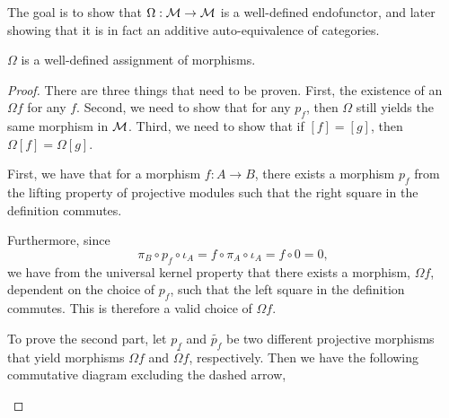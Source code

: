 The goal is to show that \( \Omega: {\mathcal{M}} \to {\mathcal{M}} \) is a well-defined endofunctor, and later showing that it is in fact an additive auto-equivalence of categories.

\begin{lemma}
    \label{lem:stmod_omega_f_is_well_defined}
    \( \Omega \) is a well-defined assignment of morphisms.
\end{lemma}
\begin{proof}
    There are three things that need to be proven. First, the existence of an \( \Omega f \) for any \( f \). Second, we need to show that for any \( p_f \), then \( \Omega \) still yields the same morphism in \( {\mathcal{M}} \). Third, we need to show that if \( [f] = [g] \), then \( \Omega [f] = \Omega [g] \).

    First, we have that for a morphism \( f: A \to B \), there exists a morphism \( p_f \) from the lifting property of projective modules such that the right square in the definition commutes.

    Furthermore, since
    \[
        \pi_B \circ p_f \circ \iota_A = f \circ \pi_A \circ \iota_A = f \circ 0 = 0,
    \]
    we have from the universal kernel property that there exists a morphism, \( \Omega f \), dependent on the choice of \( p_f \), such that the left square in the definition commutes. This is therefore a valid choice of \( \Omega f \).

    To prove the second part, let \( p_f \) and \( \widetilde{p_f} \) be two different projective morphisms that yield morphisms \( \Omega f \) and \( \widetilde{\Omega f} \), respectively. Then we have the following commutative diagram excluding the dashed arrow,
    \begin{center}
    \end{center}


\end{proof}
